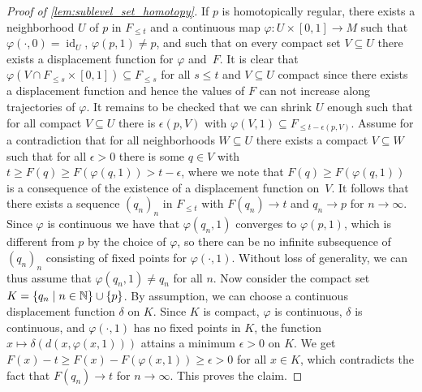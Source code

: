 \begin{proof}[Proof of \cref{lem:sublevel_set_homotopy}]
	If $p$ is homotopically regular, there exists a neighborhood $U$ of $p$ in $F_{\leq t}$ and a continuous map $\varphi \colon U \times [0,1] \to M$ such that $\varphi(\cdot,0) = \operatorname{id}_{U}$, $\varphi(p,1) \neq p$, and such that on every compact set $V \subseteq U$ there exists a displacement function for $\varphi$ and~$F$.
	It is clear that $\varphi(V \cap F_{\leq s} \times [0,1]) \subseteq F_{\leq s}$ for all $s \leq t$ and $V \subseteq U$ compact since there exists a displacement function and hence the values of $F$ can not increase along trajectories of $\varphi$.
	It remains to be checked that we can shrink $U$ enough such that for all compact $V \subseteq U$ there is $\epsilon(p,V)$ with $\varphi(V,1) \subseteq F_{\leq t - \epsilon(p,V)}$.
	Assume for a contradiction that for all neighborhoods $W \subseteq U$ there exists a compact $V \subseteq W$ such that for all $\epsilon > 0$ there is some $q \in V$ with $t \geq F(q) \geq F(\varphi(q,1)) > t - \epsilon$, where we note that $F(q) \geq F(\varphi(q,1))$ is a consequence of the existence of a displacement function on~$V$.
	It follows that there exists a sequence $(q_{n})_{n}$ in $F_{\leq t}$ with $F(q_{n}) \to t$ and $q_{n} \to p$ for $n \to \infty$.
	Since $\varphi$ is continuous we have that $\varphi(q_{n},1)$ converges to $\varphi(p,1)$, which is different from $p$ by the choice of $\varphi$, so there can be no infinite subsequence of $(q_{n})_{n}$ consisting of fixed points for $\varphi(\cdot,1)$.
	Without loss of generality, we can thus assume that $\varphi(q_{n},1) \neq q_{n}$ for all $n$.
	Now consider the compact set $K = \{q_{n} \mid n \in \mathbb{N} \} \cup \{p\}$.
	By assumption, we can choose a continuous displacement function $\delta$ on $K$.
	Since $K$ is compact, $\varphi$ is continuous, $\delta$ is continuous, and $\varphi(\cdot,1)$ has no fixed points in $K$, the function $x \mapsto \delta(d(x,\varphi(x,1)))$ attains a minimum $\epsilon > 0$ on $K$.
	We get $F(x) - t \geq F(x) - F(\varphi(x,1)) \geq \epsilon > 0$ for all $x \in K$, which contradicts the fact that $F(q_{n}) \to t$ for $n \to \infty$.
	This proves the claim.
	

\end{proof}
